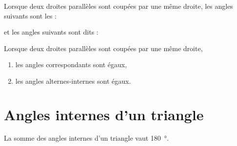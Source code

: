 

\begin{definition}
    Lorsque deux droites parallèles sont coupées par une même droite, les angles suivants sont les  :


\begin{center}
   
\end{center}

et les angles suivants sont dits  :

\begin{center}
   
\end{center}

\end{definition}

\begin{propriete}
    Lorsque deux droites parallèles sont coupées par une même droite,
    \begin{enumerate}
        \item
            les angles correspondants sont égaux,
        \item
            les angles alternes-internes sont égaux.
    \end{enumerate}
\end{propriete}

\section{Angles internes d'un triangle}



\begin{theorem}
    La somme des angles internes d'un triangle vaut \SI{180}{\degree}.
\end{theorem}

